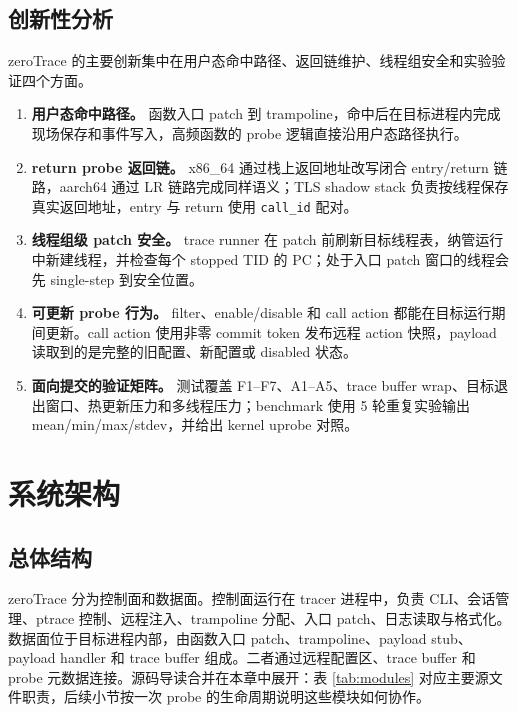 \documentclass[UTF8,a4paper,11pt,fontset=fandol]{ctexart}
\newcommand{\code}[1]{\texttt{#1}}
\begin{document}
\subsection{创新性分析}

zeroTrace 的主要创新集中在用户态命中路径、返回链维护、线程组安全和实验验证四个方面。

\begin{enumerate}[leftmargin=2.4em]
  \item \textbf{用户态命中路径。} 函数入口 patch 到 trampoline，命中后在目标进程内完成现场保存和事件写入，高频函数的 probe 逻辑直接沿用户态路径执行。
  \item \textbf{return probe 返回链。} x86\_64 通过栈上返回地址改写闭合 entry/return 链路，aarch64 通过 LR 链路完成同样语义；TLS shadow stack 负责按线程保存真实返回地址，entry 与 return 使用 \code{call\_id} 配对。
  \item \textbf{线程组级 patch 安全。} trace runner 在 patch 前刷新目标线程表，纳管运行中新建线程，并检查每个 stopped TID 的 PC；处于入口 patch 窗口的线程会先 single-step 到安全位置。
  \item \textbf{可更新 probe 行为。} filter、enable/disable 和 call action 都能在目标运行期间更新。call action 使用非零 commit token 发布远程 action 快照，payload 读取到的是完整的旧配置、新配置或 disabled 状态。
  \item \textbf{面向提交的验证矩阵。} 测试覆盖 F1--F7、A1--A5、trace buffer wrap、目标退出窗口、热更新压力和多线程压力；benchmark 使用 5 轮重复实验输出 mean/min/max/stdev，并给出 kernel uprobe 对照。
\end{enumerate}

\section{系统架构}

\subsection{总体结构}

zeroTrace 分为控制面和数据面。控制面运行在 tracer 进程中，负责 CLI、会话管理、ptrace 控制、远程注入、trampoline 分配、入口 patch、日志读取与格式化。数据面位于目标进程内部，由函数入口 patch、trampoline、payload stub、payload handler 和 trace buffer 组成。二者通过远程配置区、trace buffer 和 probe 元数据连接。源码导读合并在本章中展开：表 \ref{tab:modules} 对应主要源文件职责，后续小节按一次 probe 的生命周期说明这些模块如何协作。
\end{document}
